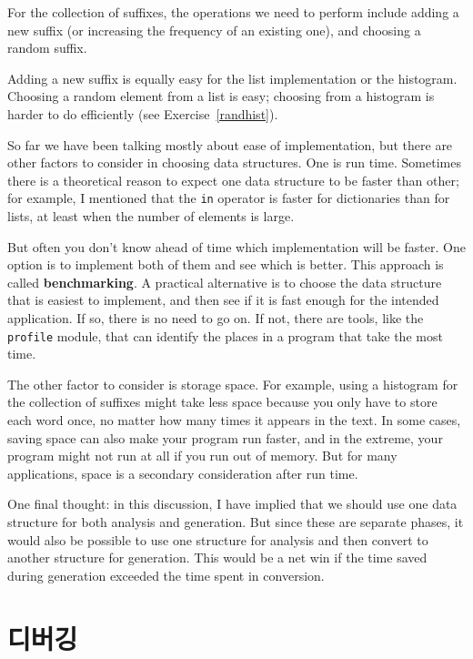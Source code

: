 \documentclass[10pt]{book}
\begin{document}
For the collection of suffixes, the operations we need to
perform include adding a new suffix (or increasing the frequency
of an existing one), and choosing a random suffix.

Adding a new suffix is equally easy for the list implementation
or the histogram.  Choosing a random element from a list
is easy; choosing from a histogram is harder to do
efficiently (see Exercise~\ref{randhist}).

So far we have been talking mostly about ease of implementation,
but there are other factors to consider in choosing data structures.
One is run time.  Sometimes there is a theoretical reason to expect
one data structure to be faster than other; for example, I mentioned
that the {\tt in} operator is faster for dictionaries than for lists,
at least when the number of elements is large.

But often you don't know ahead of time which implementation will
be faster.  One option is to implement both of them and see which
is better.  This approach is called {\bf benchmarking}.  A practical
alternative is to choose the data structure that is
easiest to implement, and then see if it is fast enough for the
intended application.  If so, there is no need to go on.  If not,
there are tools, like the {\tt profile} module, that can identify
the places in a program that take the most time.

The other factor to consider is storage space.  For example, using a
histogram for the collection of suffixes might take less space because
you only have to store each word once, no matter how many times it
appears in the text.  In some cases, saving space can also make your
program run faster, and in the extreme, your program might not run at
all if you run out of memory.  But for many applications, space is a
secondary consideration after run time.

One final thought: in this discussion, I have implied that
we should use one data structure for both analysis and generation.  But
since these are separate phases, it would also be possible to use one
structure for analysis and then convert to another structure for
generation.  This would be a net win if the time saved during
generation exceeded the time spent in conversion.


\section{디버깅}
\end{document}
